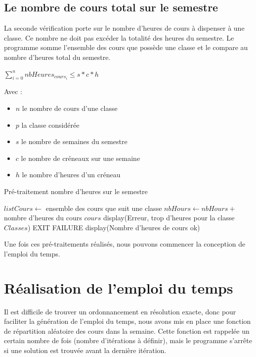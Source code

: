 \documentclass[12pt,a4paper,french]{article}
\begin{document}
\newpage

\subsection{Le nombre de cours total sur le semestre}
La seconde vérification porte sur le nombre d'heures de cours à dispenser à une classe. Ce nombre ne doit pas excéder la totalité des heures du semestre. Le programme somme l'ensemble des cours que possède une classe et le compare au nombre d'heures total du semestre.

\begin{center}
$\sum_{i=0}^n nbHeures_{cours_i} \leq s*c*h$
\end{center}

Avec :
\begin{itemize}
\item $n$ le nombre de cours d'une classe
\item $p$ la classe considérée
\item $s$ le nombre de semaines du semestre
\item $c$ le nombre de créneaux sur une semaine
\item $h$ le nombre d'heures d'un créneau
\end{itemize}

\begin{algorithm}
\caption{Pré-traitement nombre d'heures sur le semestre}
\begin{algorithmic}
\STATE $listCours \leftarrow$ ensemble des cours que suit une classe
\STATE $nbHours \leftarrow nbHours +$ nombre d'heures du cours $cours$
\ENDFOR
{}
\STATE display(Erreur, trop d'heures pour la classe $Classes$)
\STATE EXIT FAILURE
\ENDIF
\ENDFOR
\STATE display(Nombre d'heures de cours ok)
\end{algorithmic}
\end{algorithm}

Une fois ces pré-traitements réalisés, nous pouvons commencer la conception de l'emploi du temps.

\newpage
\section{Réalisation de l'emploi du temps}
Il est difficile de trouver un ordonnancement en résolution exacte, donc pour faciliter la génération de l'emploi du temps, nous avons mis en place une fonction de répartition aléatoire des cours dans la semaine. Cette fonction est rappelée un certain nombre de fois (nombre d'itérations à définir), mais le programme s'arrête si une solution est trouvée avant la dernière itération.\\
\end{document}
